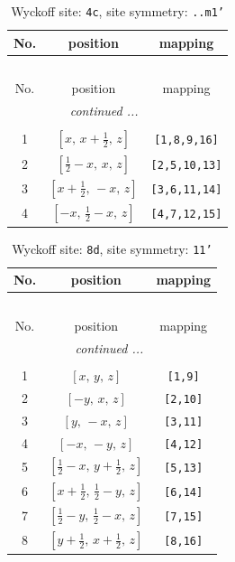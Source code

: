 \documentclass[fleqn,8pt]{jsarticle}
\begin{document}
\renewcommand{\arraystretch}{1.2}
\begin{longtable}{ccc}
\caption{Wyckoff site: {\tt 4c}, site symmetry: {\tt ..m1'}}
 \\
 \hline \hline
No. & position & mapping \\ \hline \endfirsthead

\multicolumn{2}{l}{\tablename\ \thetable{}} \\
 \hline \hline
No. & position & mapping \\ \hline \endhead

 \hline \hline
\multicolumn{2}{r}{\footnotesize\it continued ...} \\ \endfoot

 \hline \hline
\multicolumn{2}{r}{} \\ \endlastfoot

1 & $\left[ x,\, x + \frac{1}{2},\, z \right]$ & {\tt [1,8,9,16]} \\ \hline
2 & $\left[ \frac{1}{2} - x,\, x,\, z \right]$ & {\tt [2,5,10,13]} \\ \hline
3 & $\left[ x + \frac{1}{2},\, - x,\, z \right]$ & {\tt [3,6,11,14]} \\ \hline
4 & $\left[ - x,\, \frac{1}{2} - x,\, z \right]$ & {\tt [4,7,12,15]} \\
\end{longtable}
\renewcommand{\arraystretch}{1.2}
\begin{longtable}{ccc}
\caption{Wyckoff site: {\tt 8d}, site symmetry: {\tt 11'}}
 \\
 \hline \hline
No. & position & mapping \\ \hline \endfirsthead

\multicolumn{2}{l}{\tablename\ \thetable{}} \\
 \hline \hline
No. & position & mapping \\ \hline \endhead

 \hline \hline
\multicolumn{2}{r}{\footnotesize\it continued ...} \\ \endfoot

 \hline \hline
\multicolumn{2}{r}{} \\ \endlastfoot

1 & $\left[ x,\, y,\, z \right]$ & {\tt [1,9]} \\ \hline
2 & $\left[ - y,\, x,\, z \right]$ & {\tt [2,10]} \\ \hline
3 & $\left[ y,\, - x,\, z \right]$ & {\tt [3,11]} \\ \hline
4 & $\left[ - x,\, - y,\, z \right]$ & {\tt [4,12]} \\ \hline
5 & $\left[ \frac{1}{2} - x,\, y + \frac{1}{2},\, z \right]$ & {\tt [5,13]} \\ \hline
6 & $\left[ x + \frac{1}{2},\, \frac{1}{2} - y,\, z \right]$ & {\tt [6,14]} \\ \hline
7 & $\left[ \frac{1}{2} - y,\, \frac{1}{2} - x,\, z \right]$ & {\tt [7,15]} \\ \hline
8 & $\left[ y + \frac{1}{2},\, x + \frac{1}{2},\, z \right]$ & {\tt [8,16]} \\
\end{longtable}
\end{document}

